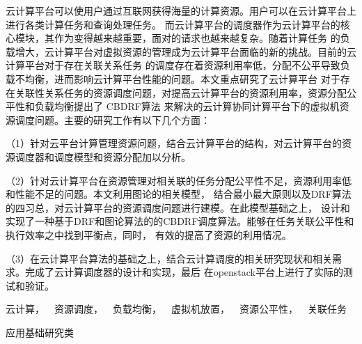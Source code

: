 
\begin{cabstract}
	
	云计算平台可以使用户通过互联网获得海量的计算资源。用户可以在云计算平台上进行各类计算任务和查询处理任务。
	而云计算平台的调度器作为云计算平台的核心模块，其作为变得越来越重要，面对的请求也越来越复杂。随着计算任务
	的负载增大，云计算平台对虚拟资源的管理成为云计算平台面临的新的挑战。目前的云计算平台对于存在关联关系任务
	的调度存在着资源利用率低，分配不公平导致负载不均衡，进而影响云计算平台性能的问题。本文重点研究了云计算平台
	对于存在关联性关系任务的资源调度问题，对提高云计算平台的资源利用率，资源分配公平性和负载均衡提出了 CBDRF算法
	来解决的云计算协同计算平台下的虚拟机资源调度问题。主要的研究工作有以下几个方面：
	
	（1）针对云平台计算管理资源问题，结合云计算平台的结构，对云计算平台的资源调度器和调度模型和资源分配加以分析。

	（2）针对云计算平台在资源管理对相关联的任务分配公平性不足，资源利用率低和性能不足的问题。本文利用图论的相关模型，
结合最小最大原则以及DRF算法的四习总，对云计算平台的资源调度问题进行建模。在此模型基础之上，
设计和实现了一种基于DRF和图论算法的的CBDRF调度算法。能够在任务关联公平性和执行效率之中找到平衡点，同时，
有效的提高了资源的利用情况。

	（3）在云计算平台算法的基础之上，结合云计算调度的相关研究现状和相关需求。完成了云计算调度器的设计和实现，最后
在openstack平台上进行了实际的测试和验证。

\end{cabstract}


\begin{ckeywords}
云计算，~~资源调度，~~负载均衡，~~虚拟机放置，~~资源公平性，~~关联任务~~
\end{ckeywords}
\begin{cthesistype}
应用基础研究类
\end{cthesistype}




